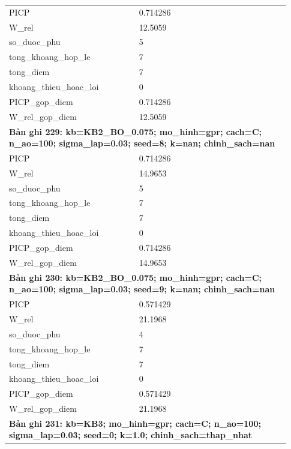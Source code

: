 \begin{longtable}{p{0.43\linewidth}p{0.50\linewidth}}
PICP & 0.714286 \\
W\_\allowbreak rel & 12.5059 \\
so\_\allowbreak duoc\_\allowbreak phu & 5 \\
tong\_\allowbreak khoang\_\allowbreak hop\_\allowbreak le & 7 \\
tong\_\allowbreak diem & 7 \\
khoang\_\allowbreak thieu\_\allowbreak hoac\_\allowbreak loi & 0 \\
PICP\_\allowbreak gop\_\allowbreak diem & 0.714286 \\
W\_\allowbreak rel\_\allowbreak gop\_\allowbreak diem & 12.5059 \\
\midrule
\multicolumn{2}{p{0.95\linewidth}}{\textbf{Bản ghi 229: kb=KB2\_BO\_0.075; mo\_hinh=gpr; cach=C; n\_ao=100; sigma\_lap=0.03; seed=8; k=nan; chinh\_sach=nan}} \\
PICP & 0.714286 \\
W\_\allowbreak rel & 14.9653 \\
so\_\allowbreak duoc\_\allowbreak phu & 5 \\
tong\_\allowbreak khoang\_\allowbreak hop\_\allowbreak le & 7 \\
tong\_\allowbreak diem & 7 \\
khoang\_\allowbreak thieu\_\allowbreak hoac\_\allowbreak loi & 0 \\
PICP\_\allowbreak gop\_\allowbreak diem & 0.714286 \\
W\_\allowbreak rel\_\allowbreak gop\_\allowbreak diem & 14.9653 \\
\midrule
\multicolumn{2}{p{0.95\linewidth}}{\textbf{Bản ghi 230: kb=KB2\_BO\_0.075; mo\_hinh=gpr; cach=C; n\_ao=100; sigma\_lap=0.03; seed=9; k=nan; chinh\_sach=nan}} \\
PICP & 0.571429 \\
W\_\allowbreak rel & 21.1968 \\
so\_\allowbreak duoc\_\allowbreak phu & 4 \\
tong\_\allowbreak khoang\_\allowbreak hop\_\allowbreak le & 7 \\
tong\_\allowbreak diem & 7 \\
khoang\_\allowbreak thieu\_\allowbreak hoac\_\allowbreak loi & 0 \\
PICP\_\allowbreak gop\_\allowbreak diem & 0.571429 \\
W\_\allowbreak rel\_\allowbreak gop\_\allowbreak diem & 21.1968 \\
\midrule
\multicolumn{2}{p{0.95\linewidth}}{\textbf{Bản ghi 231: kb=KB3; mo\_hinh=gpr; cach=C; n\_ao=100; sigma\_lap=0.03; seed=0; k=1.0; chinh\_sach=thap\_nhat}} \\

\end{longtable}
